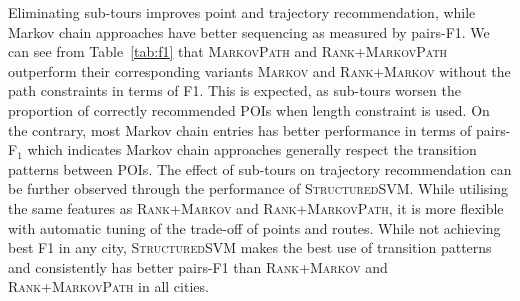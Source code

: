 Eliminating sub-tours improves point and trajectory recommendation, 
while Markov chain approaches have better sequencing as measured by pairs-F1. %
We can see from Table~\ref{tab:f1} that \textsc{MarkovPath} and \textsc{Rank+MarkovPath} 
outperform their corresponding variants \textsc{Markov} and \textsc{Rank+Markov} without the path constraints in terms of F1. 
This is expected, as sub-tours worsen the proportion of correctly
recommended POIs when length constraint is used.
On the contrary, most Markov chain entries has better performance in terms of pairs-F$_1$ 
which indicates Markov chain approaches generally
respect the transition patterns between POIs.
The effect of sub-tours on trajectory recommendation can be further observed through the performance of \textsc{StructuredSVM}.
%
While utilising the same features as \textsc{Rank+Markov} and \textsc{Rank+MarkovPath},
it is more flexible with automatic tuning of the trade-off of points and routes. 
While not achieving best F1 in any city, 
\textsc{StructuredSVM} makes the best use of transition patterns 
and consistently has better pairs-F1 than \textsc{Rank+Markov} and \textsc{Rank+MarkovPath} in all cities. 


